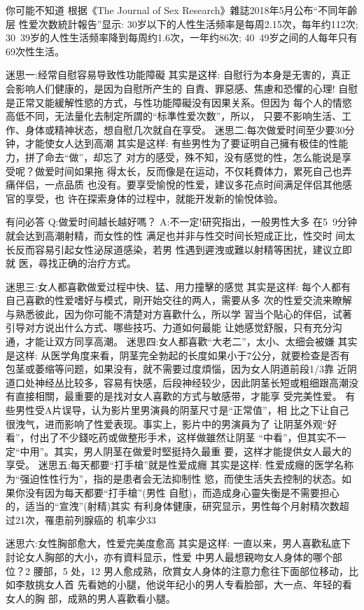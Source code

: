 \documentclass[12pt,UTF8]{ctexbook}
\begin{document}
你可能不知道
根据《The Journal of Sex Research》雜誌2018年5月公布“不同年齡层
性爱次数統計報告”显示:
30岁以下的人性生活频率是每周2.15次，每年约112次;
30~39岁的人性生活频率降到每周约1.6次，一年约86次;
40~49岁之间的人每年只有69次性生活。

迷思一:经常自慰容易导致性功能障礙
其实是这样:
自慰行为本身是无害的，真正会影响人们健康的，是因为自慰所产生的
自責、罪惡感、焦慮和恐懼的心理!
自慰是正常又能緩解性慾的方式，与性功能障礙没有因果关系。但因为
每个人的情慾高低不同，无法量化去制定所謂的“标準性爱次数”，所以，
只要不影响生活、工作、身体或精神状态，想自慰几次就自在享受。
迷思二:每次做爱时间至少要30分钟，才能使女人达到高潮
其实是这样:
有些男性为了要证明自己擁有极佳的性能力，拼了命去“做”，却忘了
对方的感受，殊不知，没有感觉的性，怎么能说是享受呢？做爱时间如果拖
得太长，反而像是在运动，不仅耗費体力，累死自己也弄痛伴侣，一点品质
也没有。要享受愉悅的性爱，建议多花点时间满足伴侣其他感官的享受，也
许在探索身体的过程中，就能开发新的愉悅体验。

有问必答
Q:做爱时间越长越好嗎？
A:不一定!研究指出，一般男性大多
在5~9分钟就会达到高潮射精，而女性的性
满足也并非与性交时间长短成正比，性交时
间太长反而容易引起女性泌尿道感染，若男
性遇到遲洩或難以射精等困扰，建议立即就
医，尋找正确的治疗方式。

迷思三:女人都喜歡做爱过程中快、猛、用力撞擊的感觉
其实是这样:
每个人都有自己喜歡的性爱嗜好与模式，剛开始交往的两人，需要从多
次的性爱交流来瞭解与熟悉彼此，因为你可能不清楚对方喜歡什么，所以学
習当个貼心的伴侣，试著引导对方说出什么方式、哪些技巧、力道如何最能
让她感觉舒服，只有充分沟通，才能让双方同享高潮。
迷思四:女人都喜歡“大老二”，太小、太细会被嫌
其实是这样:
从医学角度来看，阴茎完全勃起的长度如果小于7公分，就要检查是否有
包茎或萎缩等问题，如果没有，就不需要过度煩惱，因为女人阴道前段1/3靠
近阴道口处神经丛比较多，容易有快感，后段神经较少，因此阴茎长短或粗细跟高潮没有直接相關，最重要的是找对女人喜歡的方式与敏感带，才能享
受完美性爱。
有些男性受A片误导，认为影片里男演員的阴茎尺寸是“正常值”，相
比之下让自己很洩气，进而影响了性爱表现。事实上，影片中的男演員为了
让阴茎外观“好看”，付出了不少錢吃药或做整形手术，这样做雖然让阴茎
“中看”，但其实不一定“中用”。其实，男人阴茎在做爱时堅挺持久最重
要，这样才能提供女人最大的享受。
迷思五:每天都要“打手槍”就是性爱成癮
其实是这样:
性爱成癮的医学名称为“强迫性性行为”，指的是患者会无法抑制性
慾，而使生活失去控制的状态。如果你没有因为每天都要“打手槍”(男性
自慰)，而造成身心靈失衡是不需要担心的，适当的“宣洩”(射精)其实
有利身体健康，研究显示，男性每个月射精次数超过21次，罹患前列腺癌的
机率少33%

迷思六:女性胸部愈大，性爱完美度愈高
其实是这样:
一直以来，男人喜歡私底下討论女人胸部的大小，亦有資料显示，性爱
中男人最想親吻女人身体的哪个部位？2%
腰部，5%
处，12%
男人愈成熟，欣賞女人身体的注意力愈往下面部位移动，比如李敖挑女人首
先看她的小腿，他说年纪小的男人专看脸部，大一点、年轻的看女人的胸
部，成熟的男人喜歡看小腿。
\end{document}
